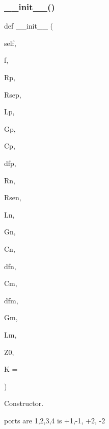 \subsubsection{\texorpdfstring{\+\_\+\+\_\+init\+\_\+\+\_\+()}{\_\_init\_\_()}}
{\footnotesize\ttfamily def \+\_\+\+\_\+init\+\_\+\+\_\+ (\begin{DoxyParamCaption}\item[{}]{self,  }\item[{}]{f,  }\item[{}]{Rp,  }\item[{}]{Rsep,  }\item[{}]{Lp,  }\item[{}]{Gp,  }\item[{}]{Cp,  }\item[{}]{dfp,  }\item[{}]{Rn,  }\item[{}]{Rsen,  }\item[{}]{Ln,  }\item[{}]{Gn,  }\item[{}]{Cn,  }\item[{}]{dfn,  }\item[{}]{Cm,  }\item[{}]{dfm,  }\item[{}]{Gm,  }\item[{}]{Lm,  }\item[{}]{Z0,  }\item[{}]{K = {} }\end{DoxyParamCaption})}



Constructor. 

ports are 1,2,3,4 is +1,-\/1, +2, -\/2



